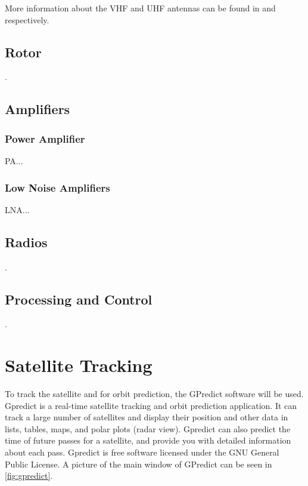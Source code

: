 More information about the VHF and UHF antennas can be found in \cite{2mcp14} and \cite{a719b} respectively.

\subsection{Rotor}

.

\subsection{Amplifiers}

\subsubsection{Power Amplifier}

PA...

\subsubsection{Low Noise Amplifiers}

LNA...

\subsection{Radios}

.

\subsection{Processing and Control}

.

\section{Satellite Tracking}

To track the satellite and for orbit prediction, the GPredict software \cite{gpredict} will be used. Gpredict is a real-time satellite tracking and orbit prediction application. It can track a large number of satellites and display their position and other data in lists, tables, maps, and polar plots (radar view). Gpredict can also predict the time of future passes for a satellite, and provide you with detailed information about each pass. Gpredict is free software licensed under the GNU General Public License. A picture of the main window of GPredict can be seen in \autoref{fig:gpredict}.

